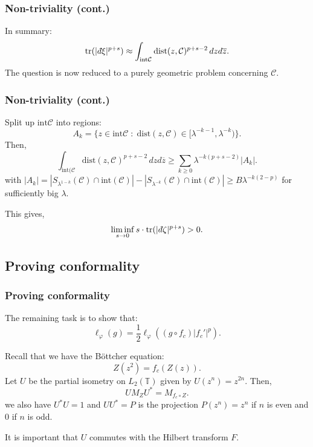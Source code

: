 \documentclass{beamer} %
\theoremstyle{definition} %
\newcommand{\Circ}{\mathbb{T}}
\newcommand{\tr}{\mathrm{tr}}
\newcommand{\dist}{\mathrm{dist}}
\def\qd{\,{\mathchar'26\mkern-12mu d}}
\begin{document}
\begin{frame}\frametitle{Non-triviality (cont.)}
    In summary:
     \begin{equation*}
         \tr(|\qd \xi|^{p+s}) \approx \int_{\mathrm{int}\mathcal{C}} \mathrm{dist}(z,\mathcal{C})^{p+s-2}\,dzd\overline{z}.
     \end{equation*}
    The question is now reduced to a purely geometric problem concerning $\mathcal{C}$.
\end{frame}

\begin{frame}\frametitle{Non-triviality (cont.)}
    Split up $\mathrm{int}\mathcal{C}$ into regions:
    \begin{equation*}
        A_k = \{z \in \mathrm{int}\mathcal{C}\;:\; \dist(z,\mathcal{C}) \in [\lambda^{-k-1},\lambda^{-k})\}.
    \end{equation*}
    Then,
    \begin{equation*}
        \int_{\mathrm{int}(\mathcal{C}} \mathrm{dist}(z,\mathcal{C})^{p+s-2} \,dzd\overline{z} \geq \sum_{k\geq 0} \lambda^{-k(p+s-2)}|A_k|.
    \end{equation*}
    with $|A_k| = |S_{\lambda^{1-k}}(\mathcal{C})\cap \mathrm{int}(\mathcal{C})|-|S_{\lambda^{-k}}(\mathcal{C})\cap \mathrm{int}(\mathcal{C})| \geq B\lambda^{-k(2-p)}$
    for sufficiently big $\lambda$.
    
    This gives,
    \begin{equation*}
        \liminf_{s\to 0} s\cdot \tr(|\qd \zeta|^{p+s}) > 0.
    \end{equation*}
\end{frame}


\subsection{Proving conformality}
\begin{frame}\frametitle{Proving conformality}
    The remaining task is to show that:
    \begin{equation*}
        \ell_{\varphi}(g) = \frac{1}{2}\ell_{\varphi}((g\circ f_c)|f_c'|^p).
    \end{equation*}

    Recall that we have the B\"ottcher equation:
    \begin{equation*}
        Z(z^2) = f_c(Z(z)).
    \end{equation*} 
    Let $U$ be the partial isometry on $L_2(\Circ)$ given by $U(z^n) = z^{2n}$. Then,
    \begin{equation*}
        UM_ZU^* = M_{f_c\circ Z}.
    \end{equation*}
    we also have $U^*U = 1$ and $UU^* = P$ is the projection $P(z^n) = z^n$ if $n$ is even and $0$ if $n$ is odd.
    
    It is important that $U$ commutes with the Hilbert transform $F$.
\end{frame}
\end{document}
